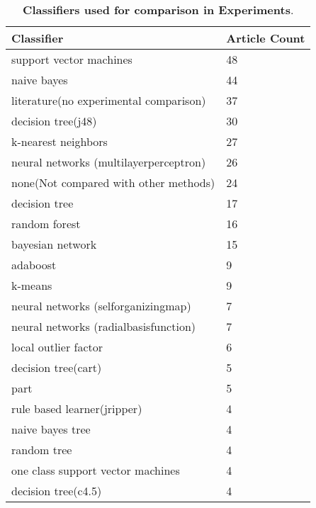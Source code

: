 
\begin{table}[!ht]
 \centering 

    \caption{ \textbf{Classifiers used for comparison in Experiments}.}

    \label{table-metaComparedClassifiers}
\footnotesize


\begin{tabular}{@{}p{}p{}@{}}

\toprule

\textbf{Classifier }                                 & \textbf{Article Count} \\

\midrule

support vector machines & 48 \\ 
naive bayes & 44 \\ 
\rowcolor{Gray}
literature(no experimental comparison) & 37 \\ 
decision tree(j48) & 30 \\ 
k-nearest neighbors & 27 \\ 
neural networks (multilayerperceptron) & 26 \\ 
\rowcolor{Gray}
none(Not compared with other methods) & 24 \\ 
decision tree & 17 \\ 
random forest & 16 \\ 
bayesian network & 15 \\ 
adaboost & 9 \\ 
k-means & 9 \\ 
neural networks (selforganizingmap) & 7 \\ 
neural networks (radialbasisfunction) & 7 \\ 
local outlier factor & 6 \\ 
decision tree(cart) & 5 \\ 
part & 5 \\ 
rule based learner(jripper) & 4 \\ 
naive bayes tree & 4 \\ 
random tree & 4 \\ 
one class support vector machines & 4 \\ 
decision tree(c4.5) & 4 \\ 

\bottomrule

\end{tabular}

\end{table}

